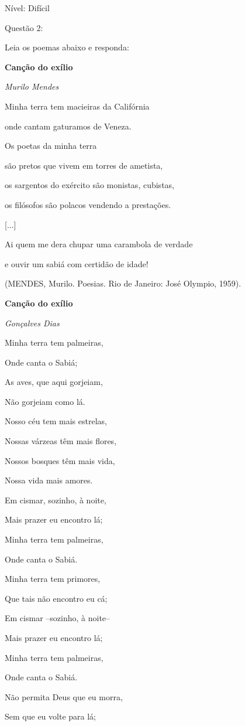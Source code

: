 Nível: Difícil

Questão 2:

Leia os poemas abaixo e responda:

\textbf{Canção do exílio}

\emph{Murilo Mendes}

Minha terra tem macieiras da Califórnia

onde cantam gaturamos de Veneza.

Os poetas da minha terra

são pretos que vivem em torres de ametista,

os sargentos do exército são monistas, cubistas,

os filósofos são polacos vendendo a prestações.

{[}...{]}

Ai quem me dera chupar uma carambola de verdade

e ouvir um sabiá com certidão de idade!

(MENDES, Murilo. Poesias. Rio de Janeiro: José Olympio, 1959).

\textbf{Canção do exílio}

\emph{Gonçalves Dias}

Minha terra tem palmeiras,

Onde canta o Sabiá;

As aves, que aqui gorjeiam,

Não gorjeiam como lá.

Nosso céu tem mais estrelas,

Nossas várzeas têm mais flores,

Nossos bosques têm mais vida,

Nossa vida mais amores.

Em cismar, sozinho, à noite,

Mais prazer eu encontro lá;

Minha terra tem palmeiras,

Onde canta o Sabiá.

Minha terra tem primores,

Que tais não encontro eu cá;

Em cismar --sozinho, à noite--

Mais prazer eu encontro lá;

Minha terra tem palmeiras,

Onde canta o Sabiá.

Não permita Deus que eu morra,

Sem que eu volte para lá;

